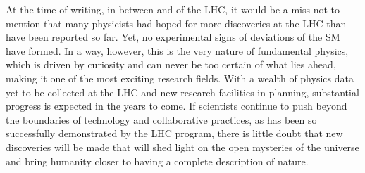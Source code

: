 
At the time of writing, in between \RunTwo and \RunThr of the LHC, it would be a miss not to mention that many physicists had hoped for more discoveries at the LHC than have been reported so far. 
Yet, no experimental signs of deviations of the SM have formed.
In a way, however, this is the very nature of fundamental physics, which is driven by curiosity and can never be too certain of what lies ahead, making it one of the most exciting research fields. 
With a wealth of physics data yet to be collected at the LHC and new research facilities in planning, substantial progress is expected in the years to come. 
If scientists continue to push beyond the boundaries of technology and collaborative practices, as has been so successfully demonstrated by the LHC program, there is little doubt that new discoveries will be made that will shed light on the open mysteries of the universe and bring humanity closer to having a complete description of nature. 

